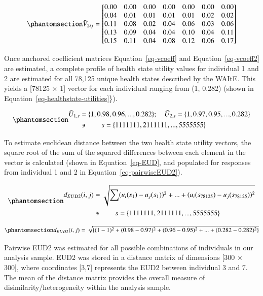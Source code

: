\documentclass[
  number,
  preprint]{elsarticle}
\begin{document}
\begin{equation}\phantomsection\label{eq-vcoeff2}{
\tilde{V}_{2ij} =  
\begin{bmatrix}
0.00 & 0.00 & 0.00 & 0.00 & 0.00 & 0.00 & 0.00 \\
0.04 & 0.01 & 0.01 & 0.01 & 0.01 & 0.02 & 0.02 \\
0.11 & 0.08 & 0.02 & 0.04 & 0.06 & 0.03 & 0.06 \\
0.13 & 0.09 & 0.04 & 0.04 & 0.10 & 0.04 & 0.11 \\
0.15 & 0.11 & 0.04 & 0.08 & 0.12 & 0.06 & 0.17
\end{bmatrix}
}\end{equation}

Once anchored coefficient matrices Equation~\ref{eq-vcoeff} and
Equation~\ref{eq-vcoeff2} are estimated, a complete profile of health
state utility values for individual 1 and 2 are estimated for all 78,125
unique health states described by the WAItE. This yields a {[}78125
\(\times\) 1{]} vector for each individual ranging from (1, 0.282)
(shown in Equation~\ref{eq-healthstate-utilities}\}).

\begin{equation}\phantomsection\label{eq-healthstate-utilities}{
\begin{aligned}  
\tilde{U}_{1,s} &=  \{1, 0.98, 0.96, ..., 0.282\}; \quad \tilde{U}_{2,s} =  \{1, 0.97, 0.95, ..., 0.282\} \\
&\backepsilon \quad \quad s = \{1111111, 2111111, ..., 5555555\}
\end{aligned}
}\end{equation}

To estimate euclidean distance between the two health state utility
vectors, the square root of the sum of the squared differences between
each element in the vector is calculated (shown in
Equation~\ref{eq-EUD}, and populated for responses from individual 1 and
2 in Equation~\ref{eq-pairwiseEUD2}).

\begin{equation}\phantomsection\label{eq-EUD2}{
  \begin{aligned}
    d_{EUD2}(i,j) & =\sqrt{\sum_{}^{}(u_{i}(s_{1})-u_{j}(s_{1}))^{2}+ ... +(u_{i}(s_{78125})-u_{j}(s_{78125}))^{2}}\\
      & \backepsilon \quad \quad s = \{1111111, 2111111, ..., 5555555\}\\
  \end{aligned}
}\end{equation}

\begin{equation}\phantomsection\label{eq-pairwiseEUD2}{
d_{EUD2}(i,j) = \sqrt{\{(1-1)^2+(0.98-0.97)^2+(0.96-0.95)^2+ ... +(0.282-0.282)^2\}}
}\end{equation}

Pairwise EUD2 was estimated for all possible combinations of individuals
in our analysis sample. EUD2 was stored in a distance matrix of
dimensions {[}300 \(\times\) 300{]}, where coordinates {[}3,7{]}
represents the EUD2 between individual 3 and 7. The mean of the distance
matrix provides the overall measure of disimilarity/heterogeneity within
the analysis sample.


  
\end{document}
